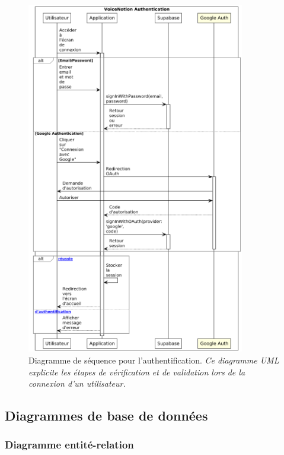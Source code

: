         \begin{figure}[htbp]
        \centering
        \includegraphics[width=0.85\textwidth]{assets/docs/voicenotion_auth_sequence.png}
        \caption{Diagramme de séquence pour l'authentification. \newline\textit{Ce diagramme UML explicite les étapes de vérification et de validation lors de la connexion d'un utilisateur.}}
        \label{fig:sequence_auth}
    \end{figure}
    
    \subsection{Diagrammes de base de données}
    
    \subsubsection{Diagramme entité-relation}
    

